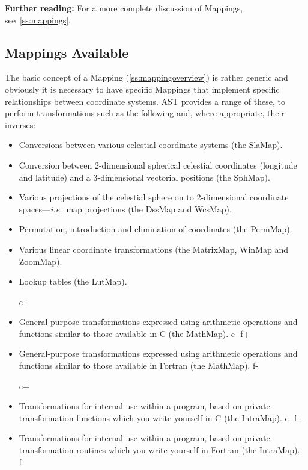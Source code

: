 \documentclass[twoside,11pt]{article}
\newcommand{\secref}[1]{\S\ref{#1}}
\renewcommand{\secref}[1]{\ref{#1}}
\begin{document}
{\bf{Further reading:}} For a more complete discussion of Mappings,
see~\secref{ss:mappings}.

\subsection{\label{ss:mappingselection}Mappings Available}

The basic concept of a Mapping (\secref{ss:mappingoverview}) is rather
generic and obviously it is necessary to have specific Mappings that
implement specific relationships between coordinate systems. AST
provides a range of these, to perform transformations such as the
following and, where appropriate, their inverses:

\begin{itemize}
\item Conversions between various celestial coordinate systems (the
SlaMap).

\item Conversion between 2-dimensional spherical celestial coordinates
(longitude and latitude) and a 3-dimensional vectorial positions (the SphMap).

\item Various projections of the celestial sphere on to 2-dimensional
coordinate spaces---{\em{i.e.}}\ map projections (the DssMap and WcsMap).

\item Permutation, introduction and elimination of coordinates (the
PermMap).

\item Various linear coordinate transformations (the MatrixMap, WinMap
and ZoomMap).

\item Lookup tables (the LutMap).

c+
\item General-purpose transformations expressed using arithmetic
operations and functions similar to those available in C (the
MathMap).
c-
f+
\item General-purpose transformations expressed using arithmetic
operations and functions similar to those available in Fortran (the
MathMap).
f-

c+
\item Transformations for internal use within a program, based on
private transformation functions which you write yourself in C (the
IntraMap).
c-
f+
\item Transformations for internal use within a program, based on
private transformation routines which you write yourself in Fortran
(the IntraMap).
f-
\end{itemize}
\end{document}
